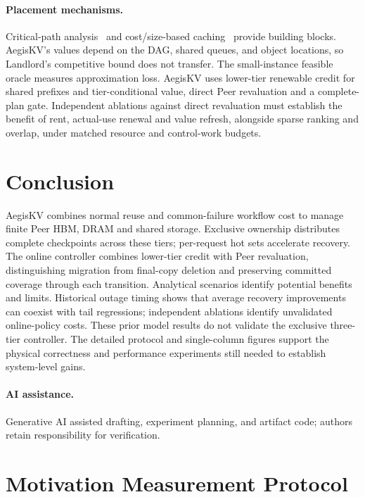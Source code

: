 \documentclass[sigplan,10pt,anonymous,nonacm]{acmart}
\begin{document}
\paragraph{Placement mechanisms.}
Critical-path analysis~\cite{kelley1959cpm} and cost/size-based caching~\cite{young2002landlord}
provide building blocks. AegisKV's values depend on the DAG, shared queues,
and object locations, so Landlord's competitive bound does not transfer. The
small-instance feasible oracle measures approximation loss. AegisKV
uses lower-tier renewable credit for shared prefixes and tier-conditional
value, direct Peer revaluation and a complete-plan gate. Independent ablations against
direct revaluation must establish the benefit of rent, actual-use renewal
and value refresh, alongside sparse ranking and overlap, under matched
resource and control-work budgets.

\section{Conclusion}
\label{sec:conclusion}

AegisKV combines normal reuse and common-failure workflow cost to manage
finite Peer HBM, DRAM and shared storage. Exclusive ownership distributes
complete checkpoints across these tiers; per-request hot sets accelerate
recovery. The online controller combines lower-tier credit with Peer
revaluation, distinguishing migration from final-copy deletion and
preserving committed coverage through each transition. Analytical
scenarios identify potential benefits and limits. Historical outage timing
shows that average recovery improvements can coexist with tail regressions;
independent ablations identify unvalidated online-policy costs. These
prior model results do not validate the exclusive three-tier controller. The detailed
protocol and single-column figures support the physical correctness and performance
experiments still needed to establish system-level gains.

\paragraph{AI assistance.}
Generative AI assisted drafting, experiment planning, and artifact code;
authors retain responsibility for verification.




\appendix
\section{Motivation Measurement Protocol}
\label{sec:motivation-protocol}
\end{document}
